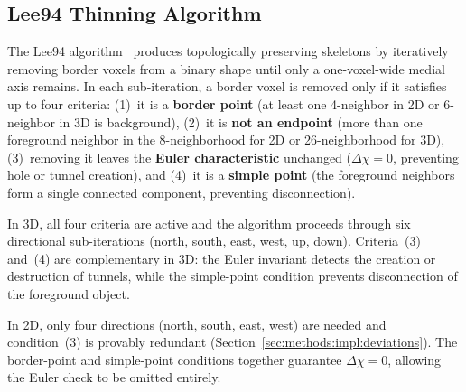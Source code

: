 \documentclass[11pt]{article}
\begin{document}
%
%
%
%
%

\subsection{Lee94 Thinning Algorithm}\label{sec:methods:lee}

The Lee94 algorithm~\cite{lee94} produces topologically
preserving skeletons by iteratively removing border voxels from a
binary shape until only a one-voxel-wide medial axis remains. In each
sub-iteration, a border voxel is removed only if it satisfies up to
four criteria:
(1)~it is a \textbf{border point} (at least one 4-neighbor in 2D or
6-neighbor in 3D is background),
(2)~it is \textbf{not an endpoint} (more than one foreground neighbor
in the 8-neighborhood for 2D or 26-neighborhood for 3D),
(3)~removing it leaves the \textbf{Euler characteristic} unchanged
($\Delta\chi = 0$, preventing hole or tunnel creation), and
(4)~it is a \textbf{simple point} (the foreground neighbors form a
single connected component, preventing disconnection).

In 3D, all four criteria are active and the algorithm proceeds through
six directional sub-iterations (north, south, east, west, up, down).
Criteria~(3) and~(4) are complementary in 3D: the Euler invariant
detects the creation or destruction of tunnels, while the simple-point
condition prevents disconnection of the foreground object.

In 2D, only four directions (north, south, east, west) are needed and
condition~(3) is provably redundant (Section~\ref{sec:methods:impl:deviations}).
The border-point and simple-point conditions together guarantee
$\Delta\chi = 0$, allowing the Euler check to be omitted entirely.
\end{document}
